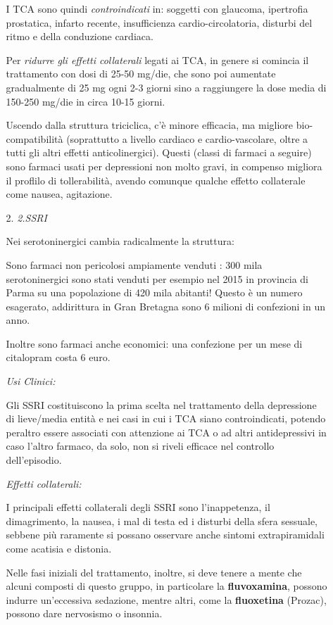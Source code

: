 \begin{itemize}
\begin{itemize}
I TCA sono quindi \emph{controindicati} in: soggetti con glaucoma,
ipertrofia prostatica, infarto recente, insufficienza
cardio-circolatoria, disturbi del ritmo e della conduzione cardiaca.

Per \emph{ridurre gli effetti collaterali} legati ai TCA, in genere si
comincia il trattamento con dosi di 25-50 mg/die, che sono poi aumentate
gradualmente di 25 mg ogni 2-3 giorni sino a raggiungere la dose media
di 150-250 mg/die in circa 10-15 giorni.

Uscendo dalla struttura triciclica, c'è minore efficacia, ma migliore
bio-compatibilità (soprattutto a livello cardiaco e cardio-vascolare,
oltre a tutti gli altri effetti anticolinergici). Questi (classi di
farmaci a seguire) sono farmaci usati per depressioni non molto gravi,
in compenso migliora il proflilo di tollerabilità, avendo comunque
qualche effetto collaterale come nausea, agitazione.

\item[2.] \emph{2.SSRI}

Nei serotoninergici cambia radicalmente la struttura:

Sono farmaci non pericolosi ampiamente venduti : 300 mila
serotoninergici sono stati venduti per esempio nel 2015 in provincia di
Parma su una popolazione di 420 mila abitanti! Questo è un numero
esagerato, addirittura in Gran Bretagna sono 6 milioni di confezioni in
un anno.

Inoltre sono farmaci anche economici: una confezione per un mese di
citalopram costa 6 euro.

\emph{\emph{Usi Clinici:}}

Gli SSRI costituiscono la prima scelta nel trattamento della depressione
di lieve/media entità e nei casi in cui i TCA siano controindicati,
potendo peraltro essere associati con attenzione ai TCA o ad altri
antidepressivi in caso l'altro farmaco, da solo, non si riveli efficace
nel controllo dell'episodio.

\emph{\emph{Effetti collaterali:}}

I principali effetti collaterali degli SSRI sono l'inappetenza, il
dimagrimento, la nausea, i mal di testa ed i disturbi della sfera
sessuale, sebbene più raramente si possano osservare anche sintomi
extrapiramidali come acatisia e distonia.

Nelle fasi iniziali del trattamento, inoltre, si deve tenere a mente che
alcuni composti di questo gruppo, in particolare la
\textbf{fluvoxamina}, possono indurre un'eccessiva sedazione, mentre
altri, come la \textbf{fluoxetina} (Prozac), possono dare nervosismo o
insonnia.


\end{itemize}
\end{itemize}
